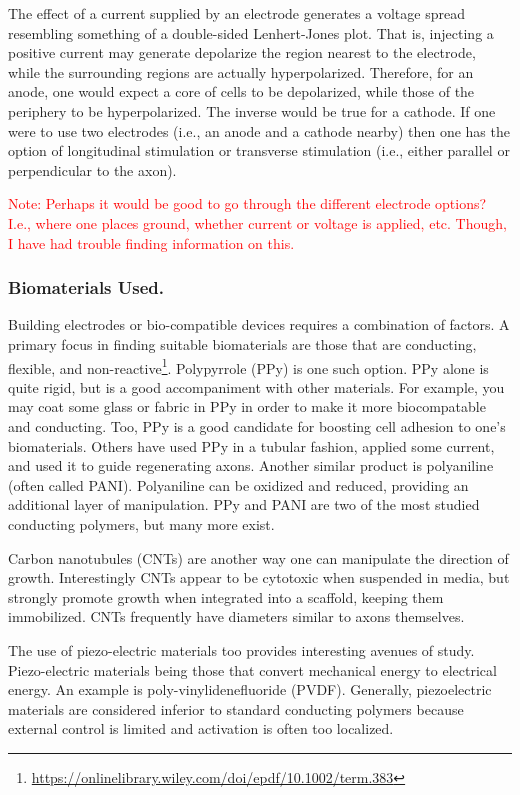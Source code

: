The effect of a current supplied by an electrode generates a voltage spread resembling something of a double-sided Lenhert-Jones plot. That is, injecting a positive current may generate depolarize the region nearest to the electrode, while the surrounding regions are actually hyperpolarized. Therefore, for an anode, one would  expect a core of cells to be depolarized, while those of the periphery to be hyperpolarized. The inverse would be true for a cathode. If one were to use two electrodes (i.e., an anode and a cathode nearby) then one has the option of longitudinal stimulation or transverse stimulation (i.e., either parallel or perpendicular to the axon).\newline

\textcolor{red}{Note: Perhaps it would be good to go through the different electrode options? I.e., where one places ground, whether current or voltage is applied, etc. Though, I have had trouble finding information on this.}

\subsubsection{Biomaterials Used.}
Building electrodes or bio-compatible devices requires a combination of factors. A primary focus in finding suitable biomaterials are those that are conducting, flexible, and non-reactive\footnote{\url{https://onlinelibrary.wiley.com/doi/epdf/10.1002/term.383}}. Polypyrrole (PPy) is one such option. PPy alone is quite rigid, but is a good accompaniment with other materials. For example, you may coat some glass or fabric in PPy in order to make it more biocompatable and conducting. Too, PPy is a good candidate for boosting cell adhesion to one's biomaterials. Others have used PPy in a tubular fashion, applied some current, and used it to guide regenerating axons. Another similar product is polyaniline (often called PANI). Polyaniline can be oxidized and reduced, providing an additional layer of manipulation. PPy and PANI are two of the most studied conducting polymers, but many more exist.\newline

Carbon nanotubules (CNTs) are another way one can manipulate the direction of growth. Interestingly CNTs appear to be cytotoxic when suspended in media, but strongly promote growth when integrated into a scaffold, keeping them immobilized. CNTs frequently have diameters similar to axons themselves.\newline

The use of piezo-electric materials too provides interesting avenues of study. Piezo-electric materials being those that convert mechanical energy to electrical energy. An example is poly-vinylidenefluoride (PVDF). Generally, piezoelectric materials are considered inferior to standard conducting polymers because external control is limited and activation is often too localized. 

